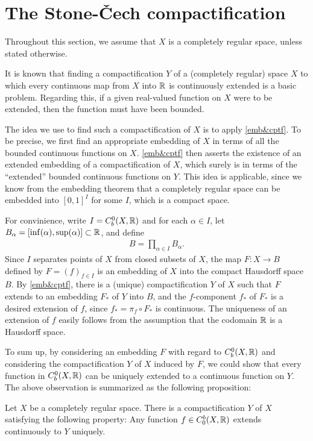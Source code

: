 \section{The Stone-\v{C}ech compactification}

Throughout this section, we assume that $X$ is a completely regular space, unless stated otherwise.

It is known that finding a compactification $Y$ of a (completely regular) space $X$ to which every continuous map from $X$ into ${\mathbb{R}}$ is continuously extended is a basic problem.
Regarding this, if a given real-valued function on $X$ were to be extended, then the function must have been bounded.

The idea we use to find such a compactification of $X$ is to apply \cref{emb&cptf}.
To be precise, we first find an appropriate embedding of $X$ in terms of all the bounded continuous functions on $X$.
\cref{emb&cptf} then asserts the existence of an extended embedding of a compactification of $X$, which surely is in terms of the ``extended'' bounded continuous functions on $Y$.
This idea is applicable, since we know from the embedding theorem that a completely regular space can be embedded into $[0, 1]^I$ for some $I$, which is a compact space.

For convinience, write $I=C_b^0(X, {\mathbb{R}})$ and for each $\alpha\in I$, let $B_\alpha=[\inf(\alpha), \sup(\alpha)]\subset{\mathbb{R}}$, and define
\begin{align*}
    B=\prod_{\alpha\in I}B_\alpha.
\end{align*}
Since $I$ separates points of $X$ from closed subsets of $X$, the map $F: X\rightarrow B$ defined by $F=(f)_{f\in I}$ is an embedding of $X$ into the compact Hausdorff space $B$.
By \cref{emb&cptf}, there is a (unique) compactification $Y$ of $X$ such that $F$ extends to an embedding $F_*$ of $Y$ into $B$, and the $f$-component $f_*$ of $F_*$ is a desired extension of $f$, since $f_*=\pi_f\circ F_*$ is continuous.
The uniqueness of an extension of $f$ easily follows from the assumption that the codomain ${\mathbb{R}}$ is a Hausdorff space.

To sum up, by considering an embedding $F$ with regard to $C_b^0(X, {\mathbb{R}})$ and considering the compactification $Y$ of $X$ induced by $F$, we could show that every function in $C_b^0(X, {\mathbb{R}})$ can be uniquely extended to a continuous function on $Y$.
The above observation is summarized as the following proposition:
\begin{prop}\label{SC-cptf_ver1}
    Let $X$ be a completely regular space.
    There is a compactification $Y$ of $X$ satisfying the following property:
    Any function $f\in C_0^b(X, {\mathbb{R}})$ extends continuously to $Y$ uniquely.
\end{prop}

